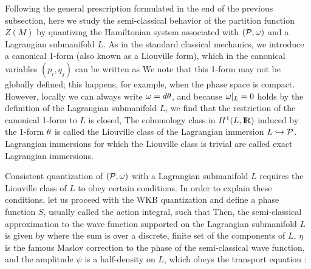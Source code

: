 Following the general prescription formulated in the end of
the previous subsection, here we study the semi-classical
behavior of the partition function $Z(M)$ by quantizing
the Hamiltonian system associated with $({\cal P},\omega)$
and a Lagrangian submanifold $L$.
As in the standard classical mechanics, we introduce
a canonical 1-form (also known as a Liouville form),
which in the canonical variables $(p_i,q_j)$ can be written as
%
\eqn{}
%
We note that this 1-form may not be globally defined;
this happens, for example, when the phase space is compact.
However, locally we can always write $\omega = d \theta$, and because
$\omega \vert_L =0$ holds by the definition of the Lagrangian submanifold $L$,
we find that the restriction of the canonical 1-form to $L$ is closed,
%
\eqn{}
%
The cohomology class in $H^1(L,\relax{\rm I\kern-.18em R})$ induced by the 1-form $\theta$
is called the Liouville class of the Lagrangian immersion
$L \hookrightarrow {\cal P}$. Lagrangian immersions for which
the Liouville class is trivial are called exact Lagrangian immersions.

Consistent quantization of $({\cal P},\omega)$ with a Lagrangian
submanifold $L$ requires the Liouville class of $L$ to obey
certain conditions. In order to explain these conditions,
let us proceed with the WKB quantization and define
a phase function $S$, usually called the action integral,
such that
%
\eqn{}
%
Then, the semi-classical approximation to the wave function
supported on the Lagrangian submanifold $L$ is given by
%
\eqn{}
%
where the sum is over a discrete, finite set of the components of $L$,
$\eta$ is the famous Maslov correction to the phase of
the semi-classical wave function, and the amplitude $\psi$
is a half-density on $L$,
which obeys the transport equation :
%
\eqn{}
%

